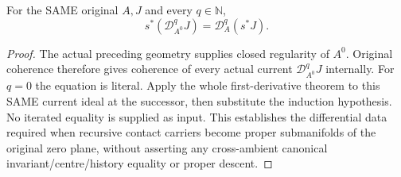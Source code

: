\begin{theorem}
\label{hir:actual-zero-section-submanifold-whole-iterated-derivative}
\leanok
For the SAME original $A,J$ and every $q\in\mathbb N$,
\[
 s^*(\mathcal D_{A^0}^qJ)=\mathcal D_A^q(s^*J).
\]
\end{theorem}
\begin{proof}
The actual preceding geometry supplies closed regularity of $A^0$. Original coherence therefore gives coherence of every actual current $\mathcal D_{A^0}^qJ$ internally. For $q=0$ the equation is literal. Apply the whole first-derivative theorem to this SAME current ideal at the successor, then substitute the induction hypothesis. No iterated equality is supplied as input. This establishes the differential data required when recursive contact carriers become proper submanifolds of the original zero plane, without asserting any cross-ambient canonical invariant/centre/history equality or proper descent.
\end{proof}
